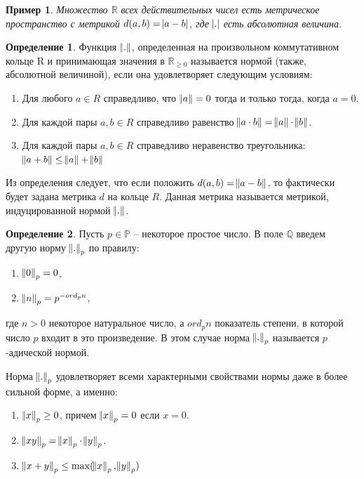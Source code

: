 \documentclass[master, och, diploma, times]{sty/SCWorks}
\theoremstyle{plain}
\newtheorem{exmp}{Пример}[section]
\theoremstyle{definition}
\newtheorem{defn}{Определение}[section]
\begin{document}
\begin{exmp}
Множество $\mathbb {R}$ всех действительных чисел есть метрическое пространство с метрикой $d(a, b)= \abs{a-b}$, где $\abs{.}$ есть абсолютная величина.
\end{exmp}


\begin{defn}
Функция $\norm{.}$, определенная на произвольном коммутативном кольце R и принимающая значения в $\mathbb {R}_{\ge 0}$ называется нормой (также, абсолютной величиной), если она удовлетворяет следующим условиям:

\begin{enumerate} 
	\item Для любого $a \in R$ справедливо, что $\norm{a}=0$ тогда и только тогда, когда $a=0$.
	\item Для каждой пары $a, b \in R$ справедливо равенство $\norm{a \cdot b} = \norm{a} \cdot \norm{b}$.
	\item Для каждой пары $a, b \in R$ справедливо неравенство треугольника: $\norm{a + b} \le \norm{a} + \norm{b}$
\end{enumerate}
\end{defn}

Из определения следует, что если положить $d(a, b)= \norm{a - b}$, то фактически будет задана метрика $d$ на кольце $R$. Данная метрика называется метрикой, индуцированной нормой $\norm{.}$.

\begin{defn}
Пусть $p \in \mathbb {P}$ -- некоторое простое число. В поле $\mathbb {Q}$ введем другую норму $\norm{.}_p$ по правилу:

\begin{enumerate} 
	\item $\norm{0}_p = 0$,
	\item $\norm{n}_p = p ^ {-ord_pn}$,
\end{enumerate}

\noindent где $n > 0$ некоторое натуральное число, а $ord_pn$ показатель степени, в которой число $p$ входит в это произведение. В этом случае норма $\norm{.}_p$ называется $p$-адической нормой.
\end{defn}

Норма $\norm{.}_p$  удовлетворяет всеми характерными свойствами нормы даже в более сильной форме, а именно:

\begin{enumerate} 
	\item $\norm{x}_p \ge 0$, причем $\norm{x}_p = 0$ если $x = 0$.
	\item $\norm{xy}_p = \norm{x}_p \cdot \norm{y}_p$.
	\item $\norm{x + y}_p \le \max(\norm{x}_p, \norm{y}_p)$ \cite{bib:analysis:volovich}
\end{enumerate}
\end{document}
